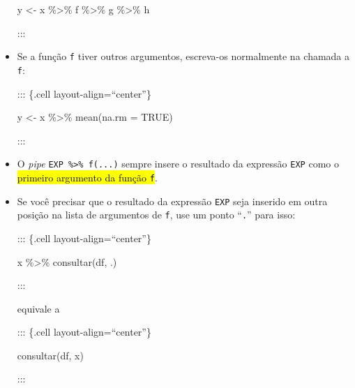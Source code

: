 \documentclass[
  letterpaper,
  DIV=11,
  numbers=noendperiod]{scrreprt}
\newenvironment{Shaded}{\begin{snugshade}}{\end{snugshade}}
\newcommand{\AttributeTok}[1]{\textcolor[rgb]{0.40,0.45,0.13}{#1}}
\newcommand{\ConstantTok}[1]{\textcolor[rgb]{0.56,0.35,0.01}{#1}}
\newcommand{\FunctionTok}[1]{\textcolor[rgb]{0.28,0.35,0.67}{#1}}
\newcommand{\NormalTok}[1]{\textcolor[rgb]{0.00,0.23,0.31}{#1}}
\newcommand{\OtherTok}[1]{\textcolor[rgb]{0.00,0.23,0.31}{#1}}
\newcommand{\SpecialCharTok}[1]{\textcolor[rgb]{0.37,0.37,0.37}{#1}}
\begin{document}
\begin{itemize}
\begin{Shaded}
\begin{Highlighting}[]
\NormalTok{y }\OtherTok{\textless{}{-}}\NormalTok{ x }\SpecialCharTok{\%\textgreater{}\%}\NormalTok{ f }\SpecialCharTok{\%\textgreater{}\%}\NormalTok{ g }\SpecialCharTok{\%\textgreater{}\%}\NormalTok{ h}
\end{Highlighting}
\end{Shaded}

  :::
\item
  Se a função \texttt{f} tiver outros argumentos, escreva-os normalmente
  na chamada a \texttt{f}:

  ::: \{.cell layout-align=``center''\}

\begin{Shaded}
\begin{Highlighting}[]
\NormalTok{y }\OtherTok{\textless{}{-}}\NormalTok{ x }\SpecialCharTok{\%\textgreater{}\%} \FunctionTok{mean}\NormalTok{(}\AttributeTok{na.rm =} \ConstantTok{TRUE}\NormalTok{)}
\end{Highlighting}
\end{Shaded}

  :::
\item
  O \emph{pipe} \texttt{EXP\ \%\textgreater{}\%\ f(...)} sempre insere o
  resultado da expressão \texttt{EXP} como o {\hl{primeiro argumento da
  função {\mbox{\texttt{f}}}}}.
\item
  Se você precisar que o resultado da expressão \texttt{EXP} seja
  inserido em outra posição na lista de argumentos de \texttt{f}, use um
  ponto ``\texttt{.}'' para isso:

  ::: \{.cell layout-align=``center''\}

\begin{Shaded}
\begin{Highlighting}[]
\NormalTok{x }\SpecialCharTok{\%\textgreater{}\%} \FunctionTok{consultar}\NormalTok{(df, .)}
\end{Highlighting}
\end{Shaded}

  :::

  equivale a

  ::: \{.cell layout-align=``center''\}

\begin{Shaded}
\begin{Highlighting}[]
\FunctionTok{consultar}\NormalTok{(df, x)}
\end{Highlighting}
\end{Shaded}

  :::
\end{itemize}
\end{document}
